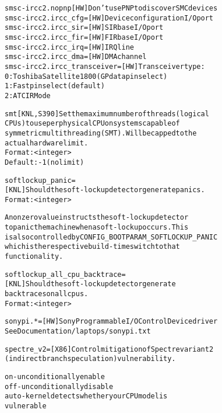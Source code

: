 \documentclass[a4paper,8pt,english]{sphinxmanual}
\begin{document}
\begin{alltt}
        smsc-ircc2.nopnp        {[}HW{]} Don't use PNP to discover SMC devices
        smsc-ircc2.ircc\_cfg=    {[}HW{]} Device configuration I/O port
        smsc-ircc2.ircc\_sir=    {[}HW{]} SIR base I/O port
        smsc-ircc2.ircc\_fir=    {[}HW{]} FIR base I/O port
        smsc-ircc2.ircc\_irq=    {[}HW{]} IRQ line
        smsc-ircc2.ircc\_dma=    {[}HW{]} DMA channel
        smsc-ircc2.ircc\_transceiver= {[}HW{]} Transceiver type:
                                0: Toshiba Satellite 1800 (GP data pin select)
                                1: Fast pin select (default)
                                2: ATC IRMode

        smt             {[}KNL,S390{]} Set the maximum number of threads (logical
                        CPUs) to use per physical CPU on systems capable of
                        symmetric multithreading (SMT). Will be capped to the
                        actual hardware limit.
                        Format: \textless{}integer\textgreater{}
                        Default: -1 (no limit)

        softlockup\_panic=
                        {[}KNL{]} Should the soft-lockup detector generate panics.
                        Format: \textless{}integer\textgreater{}

                        A nonzero value instructs the soft-lockup detector
                        to panic the machine when a soft-lockup occurs. This
                        is also controlled by CONFIG\_BOOTPARAM\_SOFTLOCKUP\_PANIC
                        which is the respective build-time switch to that
                        functionality.

        softlockup\_all\_cpu\_backtrace=
                        {[}KNL{]} Should the soft-lockup detector generate
                        backtraces on all cpus.
                        Format: \textless{}integer\textgreater{}

        sonypi.*=       {[}HW{]} Sony Programmable I/O Control Device driver
                        See Documentation/laptops/sonypi.txt

        spectre\_v2=     {[}X86{]} Control mitigation of Spectre variant 2
                        (indirect branch speculation) vulnerability.

                        on   - unconditionally enable
                        off  - unconditionally disable
                        auto - kernel detects whether your CPU model is
                               vulnerable


\end{alltt}
\end{document}
